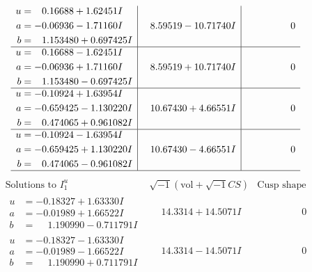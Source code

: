 \documentclass[1p]{elsarticle_modified}
\theoremstyle{definition}
\newcommand{\I}{\sqrt{-1}}
\begin{document}
$$\begin{array}{c|c|c}
\begin{aligned}
u &= \phantom{-}0.16688 + 1.62451 I \\
a &= -0.06936 - 1.71160 I \\
b &= \phantom{-}1.153480 + 0.697425 I\end{aligned}
 & \phantom{-}8.59519 - 10.71740 I & \phantom{-0.000000 } 0 \\ \hline\begin{aligned}
u &= \phantom{-}0.16688 - 1.62451 I \\
a &= -0.06936 + 1.71160 I \\
b &= \phantom{-}1.153480 - 0.697425 I\end{aligned}
 & \phantom{-}8.59519 + 10.71740 I & \phantom{-0.000000 } 0 \\ \hline\begin{aligned}
u &= -0.10924 + 1.63954 I \\
a &= -0.659425 - 1.130220 I \\
b &= \phantom{-}0.474065 + 0.961082 I\end{aligned}
 & \phantom{-}10.67430 + 4.66551 I & \phantom{-0.000000 } 0 \\ \hline\begin{aligned}
u &= -0.10924 - 1.63954 I \\
a &= -0.659425 + 1.130220 I \\
b &= \phantom{-}0.474065 - 0.961082 I\end{aligned}
 & \phantom{-}10.67430 - 4.66551 I & \phantom{-0.000000 } 0\\
 \hline 
 \end{array}$$\newpage$$\begin{array}{c|c|c}  
\text{Solutions to }I^u_{1}& \I (\text{vol} + \sqrt{-1}CS) & \text{Cusp shape}\\
 \hline 
\begin{aligned}
u &= -0.18327 + 1.63330 I \\
a &= -0.01989 + 1.66522 I \\
b &= \phantom{-}1.190990 - 0.711791 I\end{aligned}
 & \phantom{-}14.3314 + 14.5071 I & \phantom{-0.000000 } 0 \\ \hline\begin{aligned}
u &= -0.18327 - 1.63330 I \\
a &= -0.01989 - 1.66522 I \\
b &= \phantom{-}1.190990 + 0.711791 I\end{aligned}
 & \phantom{-}14.3314 - 14.5071 I & \phantom{-0.000000 } 0 \\ \hline\begin{aligned}

\end{aligned}
\end{array}$$
\end{document}

